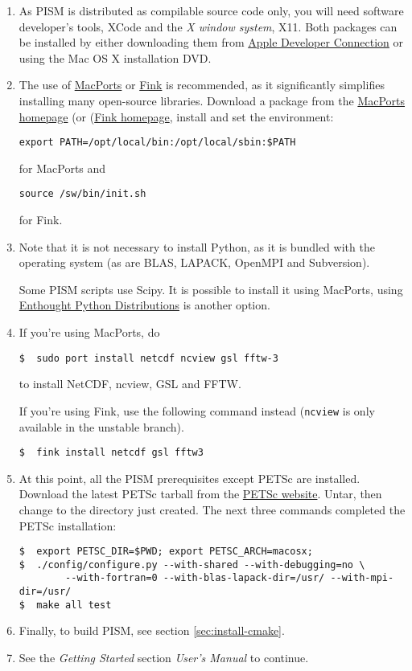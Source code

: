\documentclass[11pt,final]{amsart}
\begin{document}
\begin{enumerate}
\item As PISM is distributed as compilable source code only, you will need software developer's tools, XCode and the \emph{X
    window system}, X11. Both packages can be installed by either downloading them from
  \href{http://developer.apple.com/tools/xcode/}{Apple Developer Connection} or using the Mac OS X installation DVD.
\item The use of \href{http://www.macports.org/}{MacPorts} or \href{http://www.finkproject.org/}{Fink} is recommended, as it significantly simplifies installing many
  open-source libraries. Download a package from the \href{http://www.macports.org/install.php}{MacPorts homepage} (or
  (\href{http://www.finkproject.org/download/index.php}{Fink homepage}, install and set the environment:

\begin{verbatim}
export PATH=/opt/local/bin:/opt/local/sbin:$PATH
\end{verbatim}
for MacPorts and
\begin{verbatim}
source /sw/bin/init.sh
\end{verbatim}
for Fink.

\item Note that it is not necessary to install Python, as it is bundled with the operating system (as are BLAS, LAPACK, OpenMPI
  and Subversion).

  Some PISM scripts use Scipy. It is possible to install it using MacPorts,  using \href{http://www.enthought.com/}{Enthought Python Distributions} is another option.

\item  If you're using MacPorts, do
\begin{verbatim}
$  sudo port install netcdf ncview gsl fftw-3
\end{verbatim}%
to install NetCDF, ncview, GSL and FFTW.

If you're using Fink, use the following command instead (\texttt{ncview} is only available in the unstable branch).
\begin{verbatim}
$  fink install netcdf gsl fftw3
\end{verbatim}

\item At this point, all the PISM prerequisites except PETSc are installed. Download the latest PETSc tarball from the
  \href{http://www.mcs.anl.gov/petsc/petsc-as/}{PETSc website}. Untar, then change to the directory just created.
The next three commands completed the PETSc installation:
\begin{verbatim}
$  export PETSC_DIR=$PWD; export PETSC_ARCH=macosx;
$  ./config/configure.py --with-shared --with-debugging=no \
        --with-fortran=0 --with-blas-lapack-dir=/usr/ --with-mpi-dir=/usr/
$  make all test
\end{verbatim}
\item Finally, to build PISM, see section \ref{sec:install-cmake}.

\item See the \emph{Getting Started} section \emph{User's Manual} to continue.
\end{enumerate}
\end{document}
